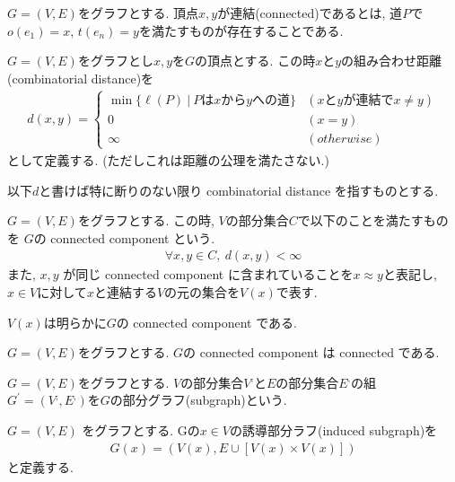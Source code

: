 \documentclass[11pt, a4paper, dvipdfmx]{jsarticle}
\theoremstyle{definition}
\newtheorem*[S]{Definition+}[Axiom+]{Definition}
\newtheorem[S]{Theorem+}[Axiom+]{Theorem}
\newtheorem[S]{Proposition+}[Axiom+]{Proposition}
\newtheorem[S]{newch+}{Newcharactor}
\begin{document}
\begin{Definition+}[連結]
    $G = (V, E)$をグラフとする. 頂点$x, y$が連結(connected)であるとは, 道$P$で
    $o(e_{1}) = x$, $t(e_{n}) = y$を満たすものが存在することである.
\end{Definition+}
\begin{Definition+}[組み合わせ距離]
    $G = (V, E)$をグラフとし$x, y$を$G$の頂点とする. この時$x$と$y$の組み合わせ距離(combinatorial distance)を
    \begin{align*}
        d(x, y) = 
        \begin{cases}
            \min\{\ell(P)~|~Pはxからyへの道\} & (xとyが連結でx\neq y)\\
            0 & (x = y) \\
            \infty & (otherwise)
        \end{cases}
    \end{align*}
    として定義する. (ただしこれは距離の公理を満たさない.)
\end{Definition+}
以下$d$と書けば特に断りのない限り combinatorial distance を指すものとする.
\begin{Definition+}
    $G = (V, E)$をグラフとする. この時, $V$の部分集合$C$で以下のことを満たすものを
    $G$の connected component という.
    \begin{align*}
        \forall x, y\in C,~ d(x, y) < \infty
    \end{align*}  
    また, $x, y$ が同じ connected component に含まれていることを$x\approx y$と表記し, $x\in V$に対して$x$と連結する$V$の元の集合を$V(x)$で表す.
\end{Definition+}
$V(x)$は明らかに$G$の connected component である.
\newpage
\begin{Proposition+}
    $G = (V, E)$をグラフとする. $G$の connected component は connected である. 
\end{Proposition+}
\begin{Definition+}[部分グラフ]
    $G = (V, E)$をグラフとする. $V$の部分集合$V^{,}$と$E$の部分集合$E^{,}$の組
    $G^{'} = (V^{,}, E^{,})$を$G$の部分グラフ(subgraph)という.
\end{Definition+}
\begin{Definition+}[誘導部分グラフ]
    $G = (V, E)$ をグラフとする. Gの$x\in V$の誘導部分ラフ(induced subgraph)を
    \begin{align*}
        G(x) = (V(x), E\cup [V(x)\times V(x)])
    \end{align*}
    と定義する.
\end{Definition+}
\end{document}
